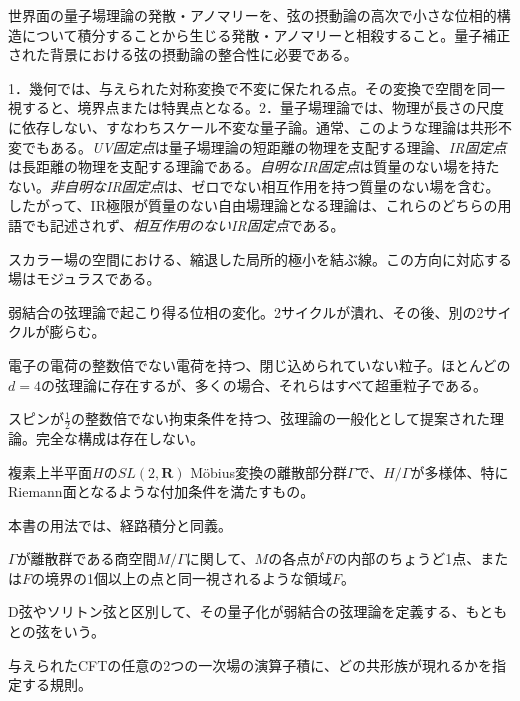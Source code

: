 {世界面の量子場理論の発散・アノマリーを、弦の摂動論の高次で小さな位相的構造について積分することから生じる発散・アノマリーと相殺すること。量子補正された背景における弦の摂動論の整合性に必要である。}

{1．幾何では、与えられた対称変換で不変に保たれる点。その変換で空間を同一視すると、境界点または特異点となる。2．量子場理論では、物理が長さの尺度に依存しない、すなわちスケール不変な量子論。通常、このような理論は共形不変でもある。\emph{UV固定点}は量子場理論の短距離の物理を支配する理論、\emph{IR固定点}は長距離の物理を支配する理論である。\emph{自明なIR固定点}は質量のない場を持たない。\emph{非自明なIR固定点}は、ゼロでない相互作用を持つ質量のない場を含む。したがって、IR極限が質量のない自由場理論となる理論は、これらのどちらの用語でも記述されず、\emph{相互作用のないIR固定点}である。}

{スカラー場の空間における、縮退した局所的極小を結ぶ線。この方向に対応する場はモジュラスである。}

{弱結合の弦理論で起こり得る位相の変化。2サイクルが潰れ、その後、別の2サイクルが膨らむ。}

{電子の電荷の整数倍でない電荷を持つ、閉じ込められていない粒子。ほとんどの$d=4$の弦理論に存在するが、多くの場合、それらはすべて超重粒子である。}

{スピンが$\frac12$の整数倍でない拘束条件を持つ、弦理論の一般化として提案された理論。完全な構成は存在しない。}

{複素上半平面$H$の$SL(2,\mathbf R)$ Möbius変換の離散部分群$\Gamma$で、$H/\Gamma$が多様体、特にRiemann面となるような付加条件を満たすもの。}

{本書の用法では、経路積分と同義。}

{$\Gamma$が離散群である商空間$M/\Gamma$に関して、$M$の各点が$F$の内部のちょうど1点、または$F$の境界の1個以上の点と同一視されるような領域$F$。}

{D弦やソリトン弦と区別して、その量子化が弱結合の弦理論を定義する、もともとの弦をいう。}

{与えられたCFTの任意の2つの一次場の演算子積に、どの共形族が現れるかを指定する規則。}

